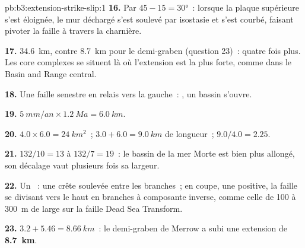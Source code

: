 \begin{solution}{pb:b3:extension-strike-slip:1}
\textbf{16.} Par $45 - 15 = \ang{30}$~: lorsque la plaque supérieure s'est éloignée, le
mur déchargé s'est soulevé par isostasie et s'est courbé, faisant pivoter la faille
à travers la charnière.

\textbf{17.} \qty{34.6}{km}, contre \qty{8.7}{km} pour le demi-graben (question
23)~: quatre fois plus. Les core complexes se situent là où l'extension est la plus forte, comme dans
le Basin and Range central.

\textbf{18.} Une faille senestre en relais vers la gauche~: , un bassin s'ouvre.

\textbf{19.} $\qty{5}{mm/an}\times\qty{1.2}{Ma} = \qty{6.0}{km}$.

\textbf{20.} $4.0\times6.0 = \qty{24}{km^2}$~; $3.0 + 6.0 = \qty{9.0}{km}$ de longueur~;
$9.0/4.0 = 2.25$.

\textbf{21.} $132/10 = 13$ à $132/7 = 19$~: le bassin de la mer Morte est bien plus
allongé, son décalage vaut plusieurs fois sa largeur.

\textbf{22.} Un ~: une crête soulevée entre les branches~; en coupe,
une  positive, la faille se divisant vers le haut en branches
à composante inverse, comme celle de 100 à \qty{300}{m} de large sur la
faille Dead Sea Transform.

\textbf{23.} $3.2 + 5.46 = \qty{8.66}{km}$~: le demi-graben de Merrow a subi
une extension de \textbf{\qty[text-series-to-math=true]{8.7}{km}}.
\end{solution}
